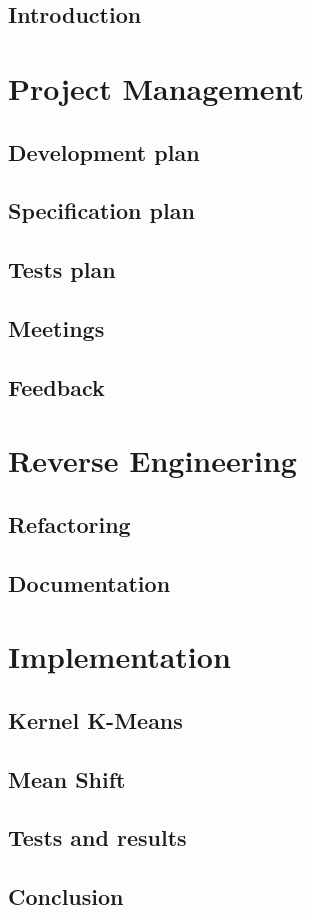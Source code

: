\documentclass{rapport_log}
\begin{document}

\tableofcontents
	\chapter*{Introduction}
		
\part{Project Management}
	\chapter{Development plan}
		
	\chapter{Specification plan}
		
	\chapter{Tests plan}
		
	\chapter{Meetings}
		
	\chapter{Feedback}
		
\part{Reverse Engineering}
	\chapter{Refactoring}
			
	\chapter{Documentation}
		
\part{Implementation}
	\chapter{Kernel K-Means}
		
	\chapter{Mean Shift}
		
	\chapter{Tests and results}
		
	\chapter*{Conclusion}
		
%		
\end{document}
